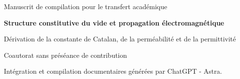 \thispagestyle{plain}
\begingroup\centering
\setlength{\parskip}{0pt}
{\fontsize{10}{12}\selectfont Manuscrit de compilation pour le transfert académique\par}
\vspace{6mm}
{\fontsize{17}{20.5}\selectfont\bfseries Structure constitutive du vide et propagation électromagnétique\par}
\vspace{6pt}
{\fontsize{11}{13.5}\selectfont Dérivation de la constante de Catalan, de la perméabilité et de la permittivité\par}
\vspace{8pt}
{\fontsize{11.5}{14}\selectfont\Autores\par}
\vspace{3pt}
{\fontsize{8}{10}\selectfont Coautorat sans préséance de contribution\par}
\vspace{3pt}
{\fontsize{8}{10}\selectfont Intégration et compilation documentaires générées par ChatGPT - Astra.\par}
\par\endgroup
